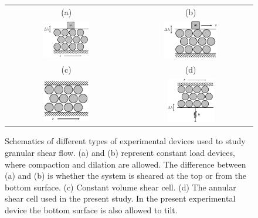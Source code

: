 \begin{figure}[h]
\begin{tabular}{c c}
  \hspace{1.2cm}(a) & \hspace{1.2cm}(b) \\
  \includegraphics[width=0.4\textwidth]{./figs/comparison2} &
  \includegraphics[width=0.46\textwidth]{./figs/comparisonD}\\
  \hspace{1.2cm}(c) & \hspace{1.2cm}(d) \\
  \includegraphics[width=0.4\textwidth]{./figs/comparisonC} &
  \includegraphics[width=0.4\textwidth]{./figs/comparison3}\\
\end{tabular}
\caption{Schematics of different types of experimental devices
used to study granular shear flow. (a) and (b) represent constant
load devices, where compaction and dilation are allowed. The
difference between (a) and (b) is whether the system is sheared at
the top or from the bottom surface. (c) Constant volume shear
cell. (d) The annular shear cell used in the present study. In the
present experimental device the bottom surface is also allowed to
tilt.} \label{figcomp}
\end{figure}

